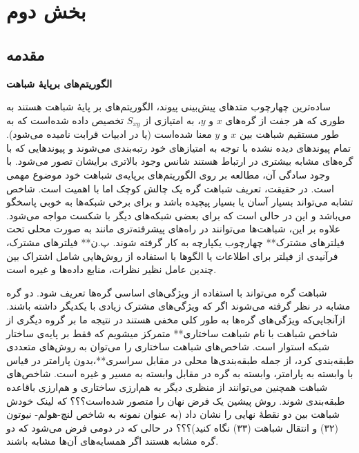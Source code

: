 \newpage
\newcommand*{\framework}{چهارچوب }
\newcommand*{\proximity}{قرابت }
\newcommand*{\likelihood}{شانس }
\newcommand*{\issue}{موضوع }
\newcommand*{\regular}{باقاعده }
\newcommand*{\quasilocal}{شبه محلی }
\newcommand*{\topology}{هم‌بندی }
\newcommand*{\collaborationnetworks}{شبکه‌های همکاری }
\newcommand*{\cosinesimilarity}{تشابه کسینوسی }
\newcommand*{\HubPromoted}{حداقلی }
\newcommand*{\hubs}{هاب‌ها }
\newcommand*{\HubDepressed}{حداکثری }
\newcommand*{\scalefree}{مستقل از اندازه }
\chapter{بخش دوم}
\section{مقدمه}
\textbf{الگوریتم‌های برپایه‌ٔ شباهت}

 ساده‌ترین \framework متدهای پیش‌بینی پیوند، الگوریتم‌های بر پایه‌ٔ شباهت هستند به طوری که هر جفت از گره‌های $x$ و $y$، به امتیازی از $S_{xy}$ تخصیص داده‌ شده‌است که به طور مستقیم شباهت بین $x$ و $y$ معنا شده‌است (یا در ادبیات \proximity نامیده می‌شود).
 تمام پیوندهای دیده نشده با توجه به امتیازهای خود رتبه‌بندی می‌شوند و پیوند‌هایی که با گره‌های مشابه بیشتری در ارتباط 
هستند \likelihood وجود بالاتری برایشان تصور می‌شود.
با وجود سادگی آن، مطالعه بر روی الگوریتم‌های برپایه‌ی شباهت خود \issue مهمی است. در حقیقت، تعریف شباهت گره یک چالش کوچک اما با اهمیت است. شاخص تشابه می‌تواند بسیار آسان یا بسیار پیچیده باشد و برای برخی شبکه‌ها به خوبی پاسخگو می‌باشد و این در حالی است که برای بعضی شبکه‌های دیگر با شکست مواجه می‌شود.
علاوه بر این، شباهت‌ها می‌توانند در راه‌های پیشرفته‌تری مانند به صورت محلی تحت فیلترهای مشترک** \framework یکپارچه به کار گرفته شوند.
پ.ن** 
فیلترهای مشترک، فرآنیدی از فیلتر برای اطلاعات یا الگوها با استفاده از روش‌هایی شامل اشتراک بین چندین عامل نظیر نظرات، منابع داده‌ها و غیره  است.

شباهت گره می‌تواند با استفاده از ویژگی‌های اساسی گره‌ها تعریف شود. دو گره مشابه در نظر گرفته می‌شوند اگر که ویژگی‌های مشترک زیادی با یکدیگر داشته باشند. ازآنجایی‌که ویژگی‌های گره‌ها به طور کلی مخفی هستند در نتیجه ما بر گروه دیگری از شاخص شباهت با نام شباهت ساختاری** متمرکز میشویم که فقط بر پایه‌ی ساختار شبکه استوار است.
شاخص‌های شباهت ساختاری را می‌توان به روش‌های متعددی طبقه‌بندی کرد، از جمله طبقه‌بندی‌ها محلی در مقابل سراسری**،بدون پارامتر در قیاس با وابسته به پارامتر، وابسته به گره در مقابل وابسته به مسیر و غیره است.
   شاخص‌های شباهت همچنین می‌توانند از منظری دیگر به هم‌ارزی ساختاری و هم‌ارزی \regular طبقه‌بندی شوند.
 روش پیشین یک فرض نهان  را متصور شده‌است؟؟؟ که لینک خودش شباهت بین دو نقطهٔ نهایی را نشان داد (به عنوان نمونه به شاخص لنچ-هولم- نیوتون (۳۲) و انتقال شباهت (۳۳) نگاه کنید)؟؟؟ در حالی که در دومی فرض می‌شود که دو گره مشابه هستند اگر همسایه‌های آن‌ها مشابه باشند.

